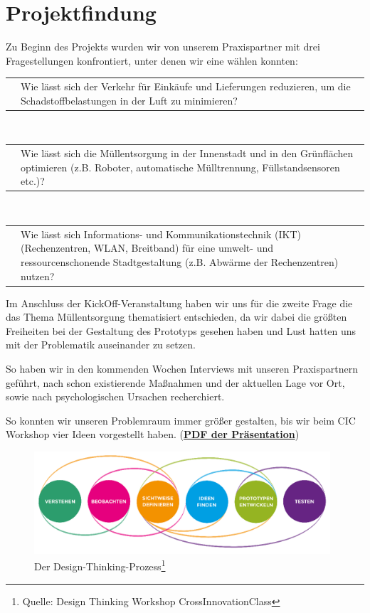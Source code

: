 \chapter{Projektfindung}\label{chp:projektfindung}

    Zu Beginn des Projekts wurden wir von unserem Praxispartner mit drei Fragestellungen konfrontiert, unter denen wir eine wählen konnten:

    \vspace{1em}
    \begin{tabular}{ l|p{13.5cm} }
        \quad & Wie lässt sich der Verkehr für Einkäufe und Lieferungen reduzieren, um die Schadstoffbelastungen in der Luft zu minimieren?
    \end{tabular}
    \\[1em]
    \begin{tabular}{ l|p{13.5cm} }
        \quad & Wie lässt sich die Müllentsorgung in der Innenstadt und in den Grünflächen optimieren (z.B. Roboter, automatische Mülltrennung, Füllstandsensoren etc.)?
    \end{tabular}
    \\[1em]
    \begin{tabular}{ l|p{13.5cm} }
        \quad & Wie lässt sich Informations- und Kommunikationstechnik (IKT) (Rechenzentren, WLAN, Breitband) für eine umwelt- und ressourcenschonende Stadtgestaltung (z.B. Abwärme der Rechenzentren) nutzen? 
    \end{tabular}
    \vspace{1em}

    Im Anschluss der KickOff-Veranstaltung haben wir uns für die zweite Frage die das Thema Müllentsorgung thematisiert entschieden, da wir dabei die größten Freiheiten bei der Gestaltung des Prototyps gesehen haben und Lust hatten uns mit der Problematik auseinander zu setzen.

    So haben wir in den kommenden Wochen Interviews mit unseren Praxispartnern geführt, nach schon existierende Maßnahmen und der aktuellen Lage vor Ort, sowie nach psychologischen Ursachen recherchiert.
    
    So konnten wir unseren Problemraum immer größer gestalten, bis wir beim CIC Workshop vier Ideen vorgestellt haben. (\href{run:attachments/Frankfurt_Ideen_CIC.pdf}{\textbf{PDF der Präsentation}})

    \begin{figure}[h]
        \begin{center}
            \includegraphics[width=11cm]{media/00_introduction/design_thinking_2.png}
        \end{center}
        \caption{Der Design-Thinking-Prozess\protect\footnote{Quelle: Design Thinking Workshop CrossInnovationClass}}
        \label{fig:dt_2}
    \end{figure}

